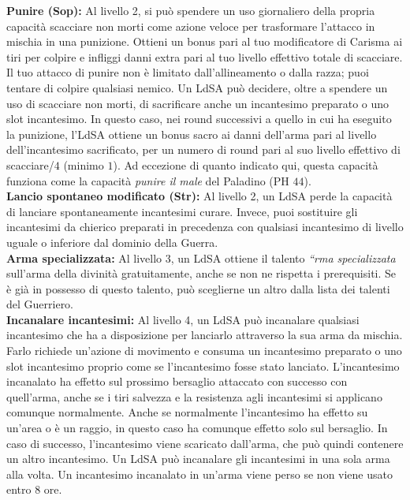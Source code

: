 \documentclass[10pt, a4paper]{report}
\begin{document}
\begin{multicols}{2}
\textbf{Punire (Sop):} Al livello 2, si può spendere un uso giornaliero della propria capacità scacciare non morti come azione veloce per trasformare l’attacco in mischia in una punizione. Ottieni un bonus pari al tuo modificatore di Carisma ai tiri per colpire e infliggi danni extra pari al tuo livello effettivo totale di scacciare. Il tuo attacco di punire non è limitato dall'allineamento o dalla razza; puoi tentare di colpire qualsiasi nemico. Un LdSA può decidere, oltre a spendere un uso di scacciare non morti, di sacrificare anche un incantesimo preparato o uno slot incantesimo. In questo caso, nei round successivi a quello in cui ha eseguito la punizione, l’LdSA ottiene un bonus sacro ai danni dell’arma pari al livello dell’incantesimo sacrificato, per un numero di round pari al suo livello effettivo di scacciare/$4$ (minimo $1$). Ad eccezione di quanto indicato qui, questa capacità funziona come la capacità \textit{punire il male} del Paladino (PH $44$).\\

\textbf{Lancio spontaneo modificato (Str):} Al livello 2, un LdSA perde la capacità di lanciare spontaneamente incantesimi curare. Invece, puoi sostituire gli incantesimi da chierico preparati in precedenza con qualsiasi incantesimo di livello uguale o inferiore dal dominio della Guerra.\\

\textbf{Arma specializzata:} Al livello 3, un LdSA ottiene il talento \textit{“rma specializzata} sull’arma della divinità gratuitamente, anche se non ne rispetta i prerequisiti. Se è già in possesso di questo talento, può sceglierne un altro dalla lista dei talenti del Guerriero.\\

\textbf{Incanalare incantesimi:} Al livello 4, un LdSA può incanalare qualsiasi incantesimo che ha a disposizione per lanciarlo attraverso la sua arma da mischia. Farlo richiede un'azione di movimento e consuma un incantesimo preparato o uno slot incantesimo proprio come se l'incantesimo fosse stato lanciato. L'incantesimo incanalato ha effetto sul prossimo bersaglio attaccato con successo con quell'arma, anche se i tiri salvezza e la resistenza agli incantesimi si applicano comunque normalmente. Anche se normalmente l'incantesimo ha effetto su un'area o è un raggio, in questo caso ha comunque effetto solo sul bersaglio. In caso di successo, l'incantesimo viene scaricato dall'arma, che può quindi contenere un altro incantesimo. Un LdSA può incanalare gli incantesimi in una sola arma alla volta. Un incantesimo incanalato in un'arma viene perso se non viene usato entro 8 ore.\\


\end{multicols}
\end{document}
